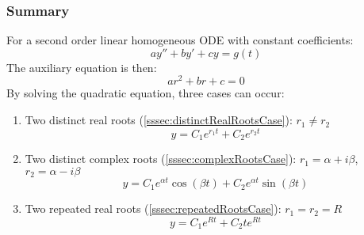 \documentclass[12pt]{article}
\begin{document}
\subsubsection{Summary}
\label{sssec:summary}

For a second order linear homogeneous ODE with constant coefficients:
\begin{equation*}
  ay'' + by' + cy = g(t)
\end{equation*}
The auxiliary equation is then:
\begin{equation*}
  ar^2 + br + c = 0
\end{equation*}
By solving the quadratic equation, three cases can occur:
\begin{enumerate}
  \itemsep0em
  \item Two distinct real roots (\ref{sssec:distinctRealRootsCase}): $r_1 \neq r_2$
    \begin{equation*}
      y = C_1e^{r_1t} + C_2e^{r_2t}
    \end{equation*}
  \item Two distinct complex roots (\ref{sssec:complexRootsCase}): $r_1 = \alpha + i \beta$, $r_2 = \alpha - i \beta$
    \begin{equation*}
      y = C_1e^{\alpha t} \cos (\beta t) + C_2e^{\alpha t} \sin (\beta t)
    \end{equation*}
  \item Two repeated real roots (\ref{sssec:repeatedRootsCase}): $r_1 = r_2 = R$
    \begin{equation*}
      y = C_1e^{Rt} + C_2te^{Rt}
    \end{equation*}
\end{enumerate}
\end{document}
